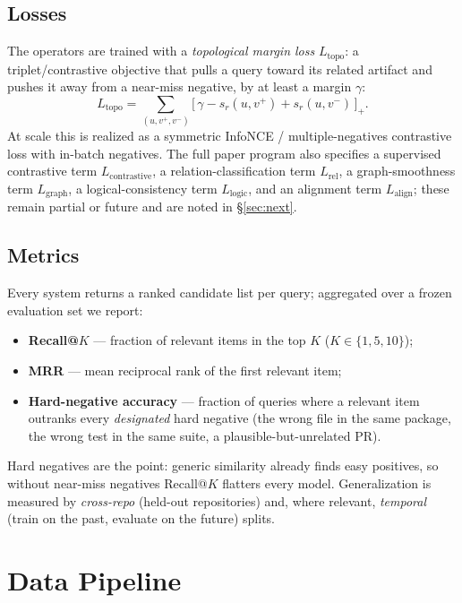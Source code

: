 \documentclass[11pt]{article}
\begin{document}
\subsection{Losses}
\label{sec:losses}

The operators are trained with a \emph{topological margin loss} $L_{\text{topo}}$:
a triplet/contrastive objective that pulls a query toward its related artifact and
pushes it away from a near-miss negative, by at least a margin $\gamma$:
\[
L_{\text{topo}} = \sum_{(u, v^{+}, v^{-})}
\big[\, \gamma - s_r(u, v^{+}) + s_r(u, v^{-}) \,\big]_{+}.
\]
At scale this is realized as a symmetric InfoNCE / multiple-negatives contrastive
loss with in-batch negatives. The full paper program also specifies a supervised
contrastive term $L_{\text{contrastive}}$, a relation-classification term
$L_{\text{rel}}$, a graph-smoothness term $L_{\text{graph}}$, a logical-consistency
term $L_{\text{logic}}$, and an alignment term $L_{\text{align}}$; these remain
partial or future and are noted in \S\ref{sec:next}.

\subsection{Metrics}
\label{sec:metrics}

Every system returns a ranked candidate list per query; aggregated over a frozen
evaluation set we report:
\begin{itemize}[leftmargin=1.4em,nosep]
\item \textbf{Recall@$K$} --- fraction of relevant items in the top $K$
($K \in \{1,5,10\}$);
\item \textbf{MRR} --- mean reciprocal rank of the first relevant item;
\item \textbf{Hard-negative accuracy} --- fraction of queries where a relevant item
outranks every \emph{designated} hard negative (the wrong file in the same package,
the wrong test in the same suite, a plausible-but-unrelated PR).
\end{itemize}
Hard negatives are the point: generic similarity already finds easy positives, so
without near-miss negatives Recall@$K$ flatters every model. Generalization is
measured by \emph{cross-repo} (held-out repositories) and, where relevant,
\emph{temporal} (train on the past, evaluate on the future) splits.

\section{Data Pipeline}
\label{sec:data}
\end{document}
